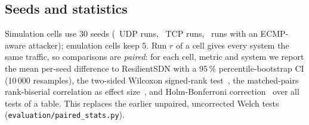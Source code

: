 \subsection{Seeds and statistics}\label{sec:stats}
Simulation cells use 30 seeds (\simRunsUDP\ UDP runs, \simRunsTCP\ TCP runs, \simRunsEcmp\ runs
with an ECMP-aware attacker); emulation cells keep 5. Run $r$ of a cell gives every system the same
traffic, so comparisons are \emph{paired}: for each cell, metric and system we report the mean
per-seed difference to ResilientSDN with a 95\,\% percentile-bootstrap CI (10\,000 resamples), the
two-sided Wilcoxon signed-rank test~\cite{wilcoxon1945}, the matched-pairs rank-biserial
correlation as effect size~\cite{kerby2014rankbiserial}, and Holm-Bonferroni
correction~\cite{holm1979} over all tests of a table. This replaces the earlier unpaired,
uncorrected Welch tests (\texttt{evaluation/paired\_stats.py}).
